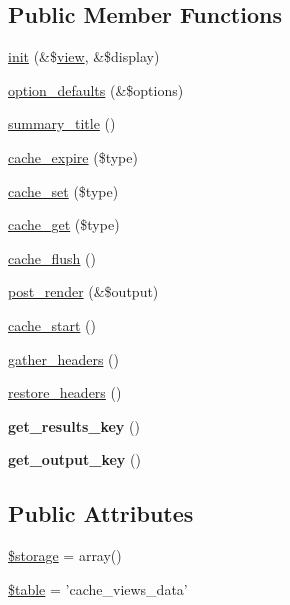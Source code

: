 \subsection*{Public Member Functions}
\begin{CompactItemize}
\item 
\hyperlink{classviews__plugin__cache_6cecf3993f6314215559c6a914f8a96b}{init} (\&\$\hyperlink{classview}{view}, \&\$display)
\item 
\hyperlink{classviews__plugin__cache_80e03aac3729dd6c35dbcf817466469e}{option\_\-defaults} (\&\$options)
\item 
\hyperlink{classviews__plugin__cache_35e5232e39c8148476328e302787d16b}{summary\_\-title} ()
\item 
\hyperlink{classviews__plugin__cache_babefa702965b1e9123a9cdc620f7d52}{cache\_\-expire} (\$type)
\item 
\hyperlink{classviews__plugin__cache_4089f1652603b3e1012a8b0f00407c05}{cache\_\-set} (\$type)
\item 
\hyperlink{classviews__plugin__cache_77d1ef6d62d4eb84209cf310194b173b}{cache\_\-get} (\$type)
\item 
\hyperlink{classviews__plugin__cache_412bdc7ee43c6c26903d22b636ea96c8}{cache\_\-flush} ()
\item 
\hyperlink{classviews__plugin__cache_ac0aacd51f591fd161fb5fb1d735e3a8}{post\_\-render} (\&\$output)
\item 
\hyperlink{classviews__plugin__cache_a59c91a728401e1a49857346ae665ce7}{cache\_\-start} ()
\item 
\hyperlink{classviews__plugin__cache_557cef7540eec7d0a6ad9cd030724ef7}{gather\_\-headers} ()
\item 
\hyperlink{classviews__plugin__cache_950552f19c93dc2132e73acc4c9198ac}{restore\_\-headers} ()
\item 
\hypertarget{classviews__plugin__cache_91e1e17b18f19de9efb5365a78bd9585}{
\textbf{get\_\-results\_\-key} ()}
\label{classviews__plugin__cache_91e1e17b18f19de9efb5365a78bd9585}

\item 
\hypertarget{classviews__plugin__cache_2c3ae60daf3a17787b37f1266a329135}{
\textbf{get\_\-output\_\-key} ()}
\label{classviews__plugin__cache_2c3ae60daf3a17787b37f1266a329135}

\end{CompactItemize}
\subsection*{Public Attributes}
\begin{CompactItemize}
\item 
\hyperlink{classviews__plugin__cache_dedb6ce98b20d56856176eb732887c89}{\$storage} = array()
\item 
\hyperlink{classviews__plugin__cache_b87d5a0d212d539d19825a26e88fc070}{\$table} = 'cache\_\-views\_\-data'
\end{CompactItemize}


